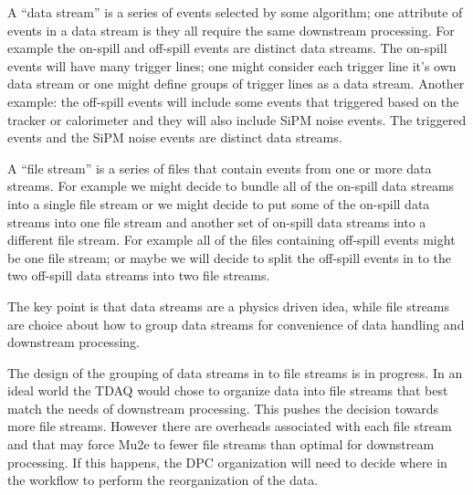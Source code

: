 
A ``data stream'' is a series of events selected by some algorithm;
one attribute of events in a data stream is they all require the same downstream processing.
For example the on-spill and off-spill events are distinct data streams.
The on-spill events will have many trigger lines; one might consider each trigger
line it's own data stream or one might define groups of trigger lines as a data stream.
Another example: the off-spill events will include some events that triggered based on
the tracker or calorimeter and they will also include SiPM noise events.
The triggered events and the SiPM noise events are distinct data streams.

A ``file stream'' is a series of files that contain events from one or more data streams.
For example we might decide to bundle all of the on-spill data streams into a single
file stream or we might decide to put some of the on-spill data streams into one file
stream and another set of on-spill data streams into a different file stream.
For example all of the files containing off-spill events might be one file stream;
or maybe we will decide to split the off-spill events in to
the two off-spill data streams into two file streams.

The key point is that data streams are a physics driven idea,
while file streams are choice about how to group data streams for convenience of data handling and downstream processing.


The design of the grouping of data streams in to file streams
is in progress.
In an ideal world the TDAQ would chose to organize data into file streams that best match the needs
of downstream processing.
This pushes the decision towards more file streams.
However there are overheads associated with each file stream and that may force Mu2e to fewer file streams
than optimal for downstream processing.
If this happens, the DPC organization will need to decide where in the workflow to perform
the reorganization of the data.

%
%
%

